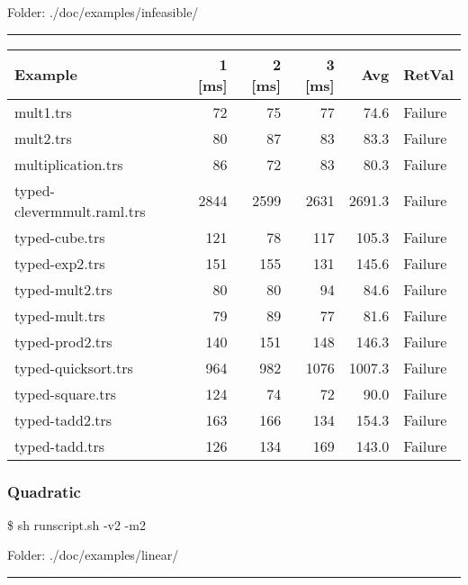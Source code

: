 \documentclass[11pt]{article}
\begin{document}
Folder: ./doc/examples/infeasible/

\rule{\linewidth}{0.5pt}

\begin{center}
\begin{tabular}{lrrrrl}
\hline
Example & 1 [ms] & 2 [ms] & 3 [ms] & Avg & RetVal\\
\hline
mult1.trs & 72 & 75 & 77 & 74.6 & Failure\\
mult2.trs & 80 & 87 & 83 & 83.3 & Failure\\
multiplication.trs & 86 & 72 & 83 & 80.3 & Failure\\
typed-clevermmult.raml.trs & 2844 & 2599 & 2631 & 2691.3 & Failure\\
typed-cube.trs & 121 & 78 & 117 & 105.3 & Failure\\
typed-exp2.trs & 151 & 155 & 131 & 145.6 & Failure\\
typed-mult2.trs & 80 & 80 & 94 & 84.6 & Failure\\
typed-mult.trs & 79 & 89 & 77 & 81.6 & Failure\\
typed-prod2.trs & 140 & 151 & 148 & 146.3 & Failure\\
typed-quicksort.trs & 964 & 982 & 1076 & 1007.3 & Failure\\
typed-square.trs & 124 & 74 & 72 & 90.0 & Failure\\
typed-tadd2.trs & 163 & 166 & 134 & 154.3 & Failure\\
typed-tadd.trs & 126 & 134 & 169 & 143.0 & Failure\\
\hline
\end{tabular}

\end{center}

\pagebreak
\subsubsection{Quadratic}
\label{sec:org690873c}

\$ sh runscript.sh -v2 -m2

Folder: ./doc/examples/linear/

\rule{\linewidth}{0.5pt}
\end{document}
